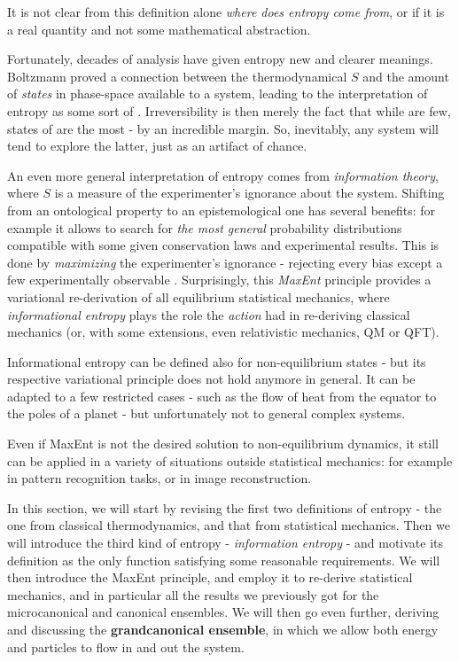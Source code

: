 \documentclass[../../main.tex]{subfiles}
\begin{document}
\medskip

It is not clear from this definition alone \textit{where does entropy come from}, or if it is a real  quantity and not some mathematical abstraction.

Fortunately, decades of analysis have given entropy new and clearer meanings. Boltzmann proved a connection between the thermodynamical $S$ and the amount of \textit{states} in phase-space available to a system, leading to the interpretation of entropy as some sort of . Irreversibility is then merely the fact that while  are few, states of  are the most - by an incredible margin. So, inevitably, any system will tend to explore the latter, just as an artifact of chance.

\medskip

An even more general interpretation of entropy comes from \textit{information theory}, where $S$ is a measure of the experimenter's ignorance about the system. Shifting from an ontological property to an epistemological one has several benefits: for example it allows to search for \textit{the most general} probability distributions compatible with some given conservation laws and experimental results. This is done by \textit{maximizing} the experimenter's ignorance - rejecting every bias except a few experimentally observable . Surprisingly, this \textit{MaxEnt} principle provides a variational re-derivation of all equilibrium statistical mechanics, where \textit{informational entropy} plays the role the \textit{action} had in re-deriving classical mechanics (or, with some extensions, even relativistic mechanics, QM or QFT).

\medskip

Informational entropy can be defined also for non-equilibrium states - but its respective variational principle does not hold anymore in general. It can be adapted to a few restricted cases - such as the flow of heat from the equator to the poles of a planet - but unfortunately not to general complex systems.

\medskip

Even if MaxEnt is not the desired solution to non-equilibrium dynamics, it still can be applied in a variety of situations outside statistical mechanics: for example in pattern recognition tasks, or in image reconstruction.

\medskip

In this section, we will start by revising the first two definitions of entropy - the one from classical thermodynamics, and that from statistical mechanics. Then we will introduce the third kind of entropy - \textit{information entropy} - and motivate its definition as the only function satisfying some reasonable requirements. We will then introduce the MaxEnt principle, and employ it to re-derive statistical mechanics, and in particular all the results we previously got for the microcanonical and canonical ensembles. We will then go even further, deriving and discussing the \textbf{grandcanonical ensemble}, in which we allow both energy and particles to flow in and out the system. 
\end{document}
